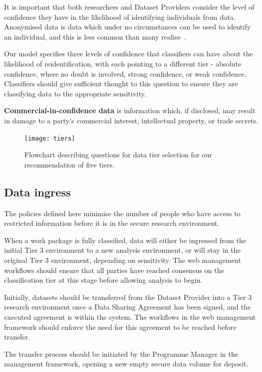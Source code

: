 \documentclass[10pt,a4paper,twocolumn]{article}
\begin{document}
It is important that both researchers and Dataset Providers consider the level of confidence they have in the likelihood of identifying individuals from data. Anonymised data is data which under no circumstances can be used to identify an individual, and this is less common than many realise~\cite{Rocher2019}.

Our model specifies three levels of confidence that classifiers can have about the likelihood of reidentification, with each pointing to a different tier - absolute confidence, where no doubt is involved, strong confidence, or weak confidence. Classifiers should give sufficient thought to this question to ensure they are classifying data to the appropriate sensitivity. 

\textbf{Commercial-in-confidence data} is information which, if disclosed, may result in damage to a party’s commercial interest, intellectual property, or trade secrets.

\begin{figure}[htbp]
  \centering
  \texttt{[image: tiers]}
  \caption{\label{tiers} Flowchart describing questions for data tier selection for our recommendation of five tiers.}
\end{figure}

\subsection{Data ingress}

The policies defined here minimise the number of people who have access to restricted information before it is in the secure research environment.

When a work package is fully classified, data will either be ingressed from the initial Tier 3 environment to a new analysis environment, or will stay in the original Tier 3 environment, depending on sensitivity. The web management workflows should ensure that all parties have reached consensus on the classification tier at this stage before allowing analysis to begin. 

Initially, datasets should be transferred from the Dataset Provider into a Tier 3 research environment once a Data Sharing Agreement has been signed, and the executed agreement is within the system. The workflows in the web management framework should enforce the need for this agreement to be reached before transfer. 

The transfer process should be initiated by the Programme Manager in the management framework, opening a new empty secure data volume for deposit.
\end{document}
